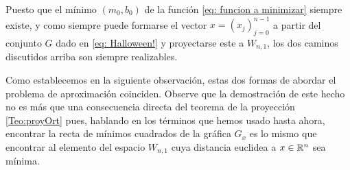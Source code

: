 Puesto que el mínimo 
$(m_{0}, b_{0})$ de la función 
\eqref{eq: funcion a minimizar} siempre existe,
y como siempre puede formarse el vector
$x=(x_{j})_{j=0}^{n-1}$ a partir del conjunto $G$
dado en \eqref{eq: Halloween!} 
y proyectarse este
a $W_{n,1}$, los dos caminos discutidos arriba
son siempre realizables.


\noindent Como establecemos en la siguiente observación, estas
dos formas de abordar el problema de aproximación
coinciden. Observe que la demostración de este hecho 
no es más que una consecuencia directa del 
teorema de la proyección \ref{Teo:proyOrt}
pues, hablando en los términos que hemos
usado hasta ahora, encontrar la recta de mínimos
cuadrados de la 
gráfica $G_{x}$ es lo mismo que encontrar al elemento
del espacio $W_{n,1}$ cuya distancia euclidea a $x \in \mathbb{R}^{n}$
sea mínima.




